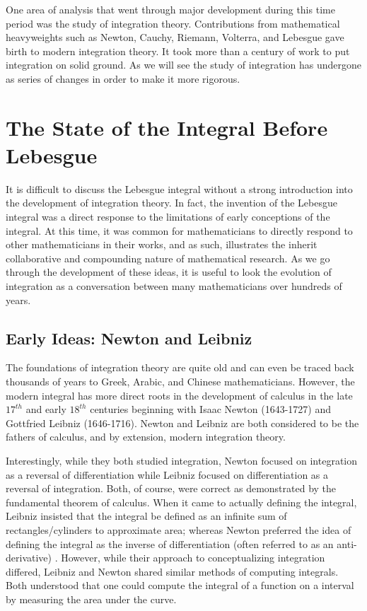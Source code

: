 \documentclass{article}
\theoremstyle{axiom} \newtheorem{axiom}{Axiom}
\theoremstyle{definition} \newtheorem{definition}{Definition}
\theoremstyle{example} \newtheorem{example}{Example}
\theoremstyle{proposition} \newtheorem{prop}{Proposition}
\theoremstyle{lemma} \newtheorem{lemma}{Lemma}
\begin{document}
One area of analysis that went through major development during this time period
was the study of integration theory. Contributions from
mathematical heavyweights such as Newton, Cauchy, Riemann, Volterra, and Lebesgue
gave birth to modern integration theory. It took
more than a century of work to put integration on solid ground. As we will see 
the study of integration has undergone as series of changes in order to make 
it more rigorous.

\section{The State of the Integral Before Lebesgue}

It is difficult to discuss the Lebesgue integral without a strong introduction 
into the development of integration theory. In fact, 
the invention of the Lebesgue integral was a direct response to the limitations
of early conceptions of the integral. At this time, it was common for mathematicians  
to directly respond to other mathematicians in their works, and as such, 
illustrates the inherit collaborative and compounding nature of mathematical
research. As we go through the development of these ideas, it is useful to look the 
evolution of integration as a conversation between many mathematicians over 
hundreds of years.

\subsection{Early Ideas: Newton and Leibniz}

The foundations of integration theory are quite old and can even be traced back 
thousands of years to Greek, Arabic, and Chinese mathematicians. However, the 
modern integral has more direct roots in the development of calculus 
in the late $17^{th}$ and early $18^{th}$ centuries beginning with Isaac Newton
(1643-1727) and Gottfried Leibniz (1646-1716). Newton and Leibniz are both 
considered to be the fathers of calculus, and by extension, modern integration 
theory. 

Interestingly, while they both studied integration, Newton focused on 
integration as a reversal of differentiation 
while Leibniz focused on differentiation as a reversal of integration. Both, of 
course, were correct as demonstrated by the fundamental theorem of 
calculus. When it came to actually defining the integral, Leibniz  insisted 
that the integral be defined as an infinite sum 
of rectangles/cylinders to approximate area; whereas Newton preferred the idea 
of defining the integral as the inverse of differentiation (often referred to
as an anti-derivative) \cite{kline:1972}. However, while their approach to 
conceptualizing integration differed, Leibniz
and Newton shared similar methods of computing integrals. Both understood that
one could compute the integral of a function on a interval by measuring the area
under the curve.
\end{document}
